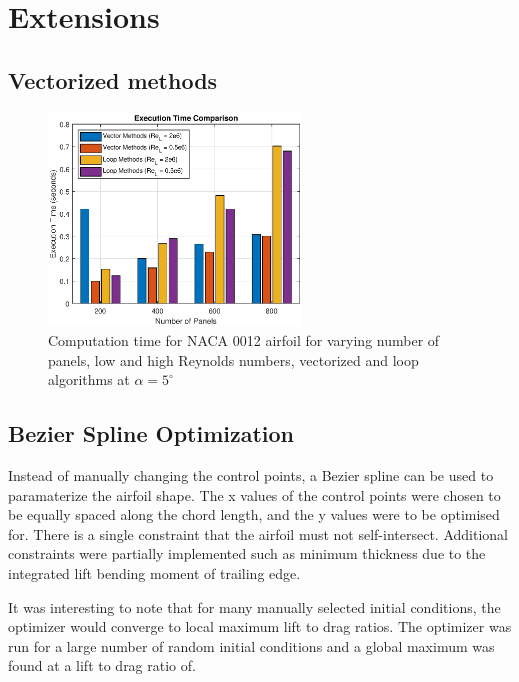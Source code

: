 \documentclass{article}
\begin{document}
\section{Extensions}

\subsection{Vectorized methods}

\begin{figure}[H]
    \centering
    \includegraphics[width=0.6\textwidth]{figures/RePanelVec_times.eps}
    \caption{Computation time for NACA 0012 airfoil for varying number of panels, low and high Reynolds numbers, vectorized and loop algorithms at $\alpha = 5^\circ$}
    \label{fig:RePanelVec_times}
\end{figure}


\subsection{Bezier Spline Optimization}

Instead of manually changing the control points, a Bezier spline can be used to paramaterize the airfoil shape.
The x values of the control points were chosen to be equally spaced along the chord length, and the y values were to be optimised for.
There is a single constraint that the airfoil must not self-intersect.
Additional constraints were partially implemented such as minimum thickness due to the integrated lift bending moment of trailing edge.

It was interesting to note that for many manually selected initial conditions, the optimizer would converge to local maximum lift to drag ratios.
The optimizer was run for a large number of random initial conditions and a global maximum was found at a lift to drag ratio of.
\end{document}
